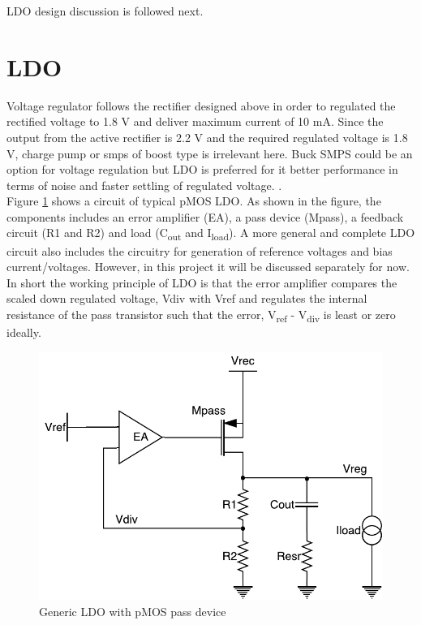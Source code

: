 \documentclass[12pt,a4paper,UKenglish]{article}
\begin{document}
LDO design discussion is followed next.

\newpage

\section{LDO}

Voltage regulator follows the rectifier designed above in order to regulated the rectified voltage to 1.8 V and deliver maximum current of 10 mA. Since the output from the active rectifier is 2.2 V and the required regulated voltage is 1.8 V, charge pump or  \acrshort{smps} of boost type is irrelevant here. Buck SMPS could be an option for voltage regulation but LDO is preferred for it better performance in terms of noise and faster settling of regulated voltage.  \cite{ldo_psu}.\\ 

Figure \ref{ldo_gen} shows a circuit of typical pMOS LDO. As shown in the figure, the components includes an error amplifier (EA), a pass device (Mpass), a feedback circuit (R1 and R2) and load (C\textsubscript{out} and I\textsubscript{load}). A more general and complete LDO circuit also includes the circuitry for generation of reference voltages and bias current/voltages. However, in this project it will be discussed separately for now. In short the working principle of LDO is that the error amplifier compares the scaled down regulated voltage, Vdiv with Vref and regulates the internal resistance of the pass transistor such that  the error, V\textsubscript{ref} - V\textsubscript{div} is least or zero ideally. 

\begin{figure}[htbp] %
   \centering
   \includegraphics[width=.9\textwidth]{img/ldo.pdf} 
   \caption{Generic LDO with pMOS pass device}
   \label{ldo_gen}
\end{figure}
\end{document}
